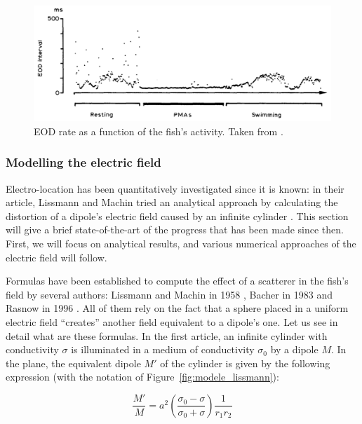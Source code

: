 \begin{figure}[h]
\centering
\includegraphics[width=\textwidth]{intro/figures/EOD_PMA}
\caption{EOD rate as a function of the fish's activity. Taken from \cite{toerring1984locomotor}.
\label{fig:EOD_stabilization}}
\end{figure}



\subsubsection{Modelling the electric field}

\label{sub:modelisation_champ_bio}

Electro-location has been quantitatively investigated since it is
known: in their article, Lissmann and Machin tried an analytical approach
by calculating the distortion of a dipole's electric field caused
by an infinite cylinder \cite{lissmann1958mechanism}. This section
will give a brief state-of-the-art of the progress that has been made
since then. First, we will focus on analytical results, and various
numerical approaches of the electric field will follow.

Formulas have been established to compute the effect of a scatterer
in the fish's field by several authors: Lissmann and Machin in 1958
\cite{lissmann1958mechanism}, Bacher in 1983 \cite{bacher1983} and
Rasnow in 1996 \cite{rasnow1996simple}. All of them rely on the fact
that a sphere placed in a uniform electric field ``creates'' another
field equivalent to a dipole's one. Let us see in detail what are
these formulas. In the first article, an infinite cylinder with conductivity
$\sigma$ is illuminated in a medium of conductivity $\sigma_{0}$
by a dipole $M$. In the plane, the equivalent dipole $M'$ of the
cylinder is given by the following expression (with the notation
of Figure~\ref{fig:modele_lissmann}):

\begin{equation}
\frac{M'}{M}=a^{2}\left(\frac{\sigma_{0}-\sigma}{\sigma_{0}+\sigma}\right)\frac{1}{r_{1}r_{2}}\label{eq:dipole_lissmann}
\end{equation}


